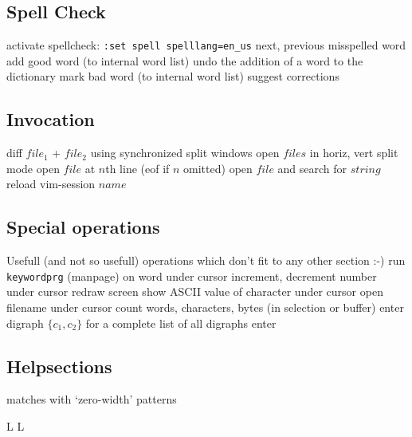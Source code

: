 \subsection{Spell Check}	{activate spellcheck: {\tt :set spell spelllang=en\_us}}
\cmdS{]s\ [s }	{next, previous misspelled word}
	{add good word (to internal word list)}
	{undo the addition of a word to the dictionary}
	{mark bad word (to internal word list)}
	{suggest corrections}

\subsection{Invocation}	{}
	{diff $file_1$ + $file_2$ using synchronized split windows}
	{open $files$ in horiz, vert split mode}
	{open $file$ at $n$th line (eof if $n$ omitted)}
	{open $file$ and search for $string$ }
	{reload vim-session $name$}

\subsection{Special operations}	{Usefull (and not so usefull) operations which don't fit to any other section :-)}
	{run {\tt keywordprg} (manpage) on word under cursor}
	{increment, decrement number under cursor}
	{redraw screen}
	{show A{\smallrm SCII} value of character under cursor}
	{open filename under cursor}
	{count words, characters, bytes (in selection or buffer)}
	{enter digraph $\{c_1,c_2\}$}
	{for a complete list of all digraphs enter}

\subsection{Helpsections}	{}
	{matches with `zero-width'  patterns}


\copyrightnotice

\vfil
\supereject
\if L\lr \else\null\vfill\eject\fi
\if L\lr \else\null\vfill\eject\fi
\bye

